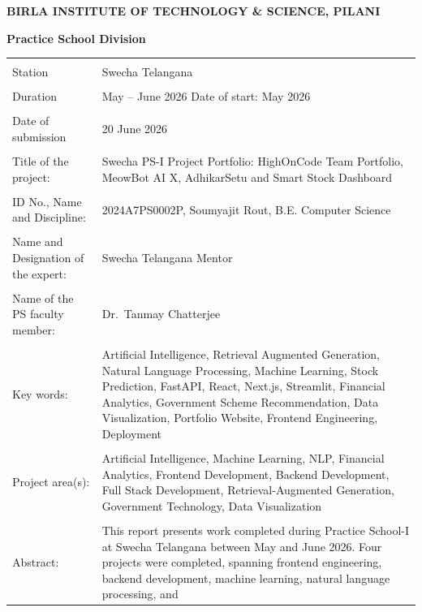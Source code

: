 \documentclass{book}
\begin{document}
\thispagestyle{empty}
\centerline{\bf BIRLA INSTITUTE OF TECHNOLOGY \& SCIENCE, PILANI}
\vspace*{0.2cm}
\centerline{\bf Practice School Division}
\vspace*{0.3cm}
{\bf
\begin{tabular}{p{5.5cm}p{7.5cm}}
  & \\
  Station & Swecha Telangana \\
  & \\
  Duration & May -- June 2026 \quad Date of start: May 2026 \\
  & \\
  Date of submission & 20 June 2026 \\
  & \\
  Title of the project: & Swecha PS-I Project Portfolio: HighOnCode Team Portfolio,
    MeowBot AI X, AdhikarSetu and Smart Stock Dashboard \\
  & \\
  ID No., Name and Discipline: & 2024A7PS0002P, Soumyajit Rout, B.E. Computer Science \\
  & \\
  Name and Designation of the expert: & Swecha Telangana Mentor \\
  & \\
  Name of the PS faculty member: & Dr.\ Tanmay Chatterjee \\
  & \\
  Key words: & Artificial Intelligence, Retrieval Augmented Generation, Natural Language
    Processing, Machine Learning, Stock Prediction, FastAPI, React, Next.js, Streamlit,
    Financial Analytics, Government Scheme Recommendation, Data Visualization,
    Portfolio Website, Frontend Engineering, Deployment \\
  & \\
  Project area(s): & Artificial Intelligence, Machine Learning, NLP, Financial Analytics,
    Frontend Development, Backend Development, Full Stack Development,
    Retrieval-Augmented Generation, Government Technology, Data Visualization \\
  & \\
  Abstract: & This report presents work completed during Practice School-I at Swecha
    Telangana between May and June 2026. Four projects were completed, spanning frontend
    engineering, backend development, machine learning, natural language processing, and

\end{tabular}}
\end{document}
